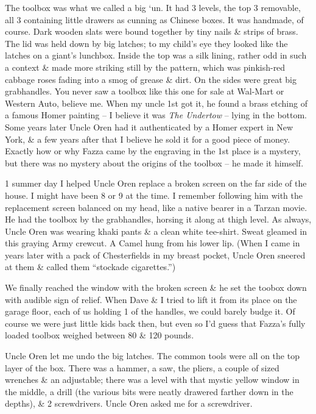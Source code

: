 \documentclass{article}
\numberwithin{equation}{section}
\begin{document}
The toolbox was what we called a big `un. It had 3 levels, the top 3 removable, all 3 containing little drawers as cunning as Chinese boxes. It was handmade, of course. Dark wooden slats were bound together by tiny nails \& strips of brass. The lid was held down by big latches; to my child's eye they looked like the latches on a giant's lunchbox. Inside the top was a silk lining, rather odd in such a context \& made more striking still by the pattern, which was pinkish-red cabbage roses fading into a smog of grease \& dirt. On the sides were great big grabhandles. You never saw a toolbox like this one for sale at Wal-Mart or Western Auto, believe me. When my uncle 1st got it, he found a brass etching of a famous Homer painting -- I believe it was \textit{The Undertow} -- lying in the bottom. Some years later Uncle Oren had it authenticated by a Homer expert in New York, \& a few years after that I believe he sold it for a good piece of money. Exactly how or why Fazza came by the engraving in the 1st place is a mystery, but there was no mystery about the origins of the toolbox -- he made it himself.

1 summer day I helped Uncle Oren replace a broken screen on the far side of the house. I might have been 8 or 9 at the time. I remember following him with the replacement screen balanced on my head, like a native bearer in a Tarzan movie. He had the toolbox by the grabhandles, horsing it along at thigh level. As always, Uncle Oren was wearing khaki pants \& a clean white tee-shirt. Sweat gleamed in this graying Army crewcut. A Camel hung from his lower lip. (When I came in years later with a pack of Chesterfields in my breast pocket, Uncle Oren sneered at them \& called them ``stockade cigarettes.'')

We finally reached the window with the broken screen \& he set the toobox down with audible sign of relief. When Dave \& I tried to lift it from its place on the garage floor, each of us holding 1 of the handles, we could barely budge it. Of course we were just little kids back then, but even so I'd guess that Fazza's fully loaded toolbox weighed between 80 \& 120 pounds.

Uncle Oren let me undo the big latches. The common tools were all on the top layer of the box. There was a hammer, a saw, the pliers, a couple of sized wrenches \& an adjustable; there was a level with that mystic yellow window in the middle, a drill (the various bits were neatly drawered farther down in the depths), \& 2 screwdrivers. Uncle Oren asked me for a screwdriver.
\end{document}
